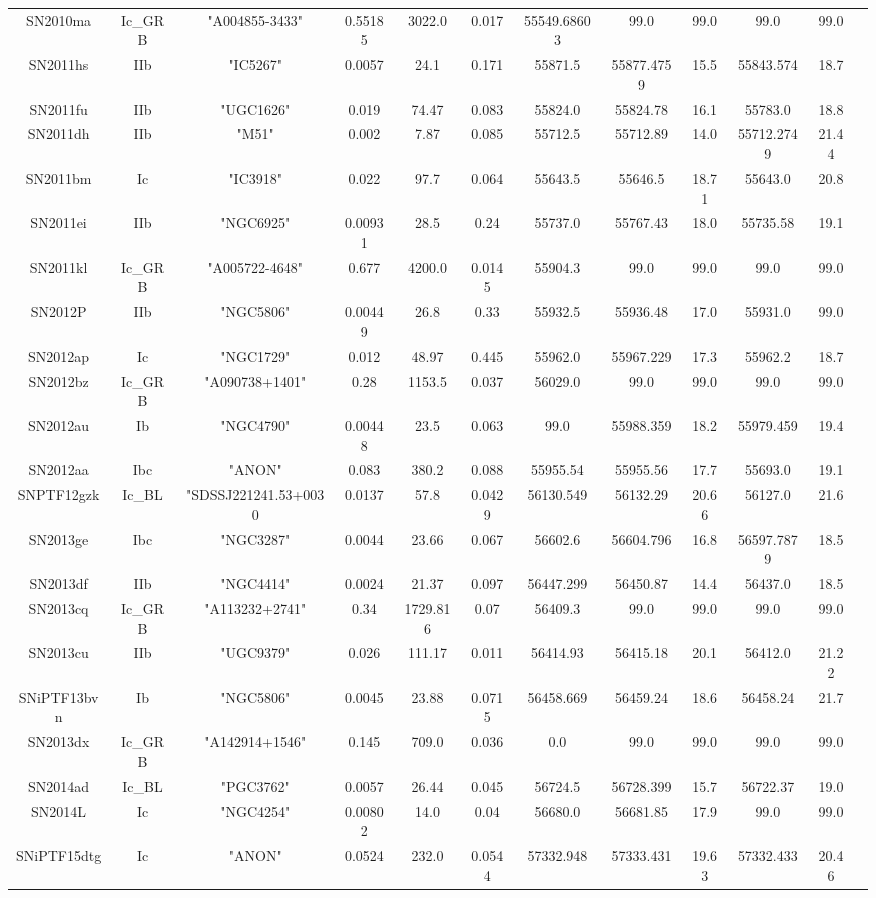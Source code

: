 \begin{table*}
\begin{tabular}{cccccccccccc}
SN2010ma&Ic_GRB&"A004855-3433"&0.55185&3022.0&0.017&55549.68603&99.0&99.0&99.0&99.0\\ 
SN2011hs&IIb&"IC5267"&0.0057&24.1&0.171&55871.5&55877.4759&15.5&55843.574&18.7\\ 
SN2011fu&IIb&"UGC1626"&0.019&74.47&0.083&55824.0&55824.78&16.1&55783.0&18.8\\ 
SN2011dh&IIb&"M51"&0.002&7.87&0.085&55712.5&55712.89&14.0&55712.2749&21.44\\ 
SN2011bm&Ic&"IC3918"&0.022&97.7&0.064&55643.5&55646.5&18.71&55643.0&20.8\\ 
SN2011ei&IIb&"NGC6925"&0.00931&28.5&0.24&55737.0&55767.43&18.0&55735.58&19.1\\ 
SN2011kl&Ic_GRB&"A005722-4648"&0.677&4200.0&0.0145&55904.3&99.0&99.0&99.0&99.0\\ 
SN2012P&IIb&"NGC5806"&0.00449&26.8&0.33&55932.5&55936.48&17.0&55931.0&99.0\\ 
SN2012ap&Ic&"NGC1729"&0.012&48.97&0.445&55962.0&55967.229&17.3&55962.2&18.7\\ 
SN2012bz&Ic_GRB&"A090738+1401"&0.28&1153.5&0.037&56029.0&99.0&99.0&99.0&99.0\\ 
SN2012au&Ib&"NGC4790"&0.00448&23.5&0.063&99.0&55988.359&18.2&55979.459&19.4\\ 
SN2012aa&Ibc&"ANON"&0.083&380.2&0.088&55955.54&55955.56&17.7&55693.0&19.1\\ 
SNPTF12gzk&Ic_BL&"SDSSJ221241.53+0030&0.0137&57.8&0.0429&56130.549&56132.29&20.66&56127.0&21.6\\ 
SN2013ge&Ibc&"NGC3287"&0.0044&23.66&0.067&56602.6&56604.796&16.8&56597.7879&18.5\\ 
SN2013df&IIb&"NGC4414"&0.0024&21.37&0.097&56447.299&56450.87&14.4&56437.0&18.5\\ 
SN2013cq&Ic_GRB&"A113232+2741"&0.34&1729.816&0.07&56409.3&99.0&99.0&99.0&99.0\\ 
SN2013cu&IIb&"UGC9379"&0.026&111.17&0.011&56414.93&56415.18&20.1&56412.0&21.22\\ 
SNiPTF13bvn&Ib&"NGC5806"&0.0045&23.88&0.0715&56458.669&56459.24&18.6&56458.24&21.7\\ 
SN2013dx&Ic_GRB&"A142914+1546"&0.145&709.0&0.036&0.0&99.0&99.0&99.0&99.0\\ 
SN2014ad&Ic_BL&"PGC3762"&0.0057&26.44&0.045&56724.5&56728.399&15.7&56722.37&19.0\\ 
SN2014L&Ic&"NGC4254"&0.00802&14.0&0.04&56680.0&56681.85&17.9&99.0&99.0\\ 
SNiPTF15dtg&Ic&"ANON"&0.0524&232.0&0.0544&57332.948&57333.431&19.63&57332.433&20.46\\ 

\end{tabular}
\end{table*}

